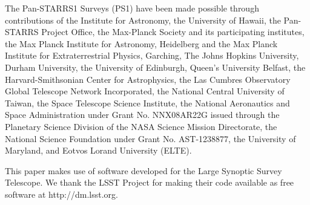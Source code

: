 \documentclass[a4paper,11pt]{article}
\begin{document}
The Pan-STARRS1 Surveys (PS1) have been made possible through
contributions of the Institute for Astronomy, the University of
Hawaii, the Pan-STARRS Project Office, the Max-Planck Society and its
participating institutes, the Max Planck Institute for Astronomy,
Heidelberg and the Max Planck Institute for Extraterrestrial Physics,
Garching, The Johns Hopkins University, Durham University, the
University of Edinburgh, Queen's University Belfast, the
Harvard-Smithsonian Center for Astrophysics, the Las Cumbres
Observatory Global Telescope Network Incorporated, the National
Central University of Taiwan, the Space Telescope Science Institute,
the National Aeronautics and Space Administration under Grant
No. NNX08AR22G issued through the Planetary Science Division of the
NASA Science Mission Directorate, the National Science Foundation
under Grant No. AST-1238877, the University of Maryland, and Eotvos
Lorand University (ELTE).

This paper makes use of software developed for the Large Synoptic
Survey Telescope. We thank the LSST Project for making their code
available as free software at http://dm.lsst.org.


\end{document}
